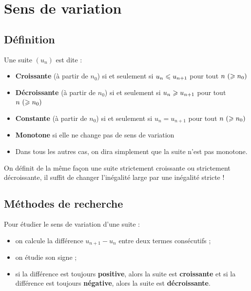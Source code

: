\documentclass[a4paper,11pt]{article}
\begin{document}
\pagebreak

\section{Sens de variation}

\subsection{Définition}

\begin{cdefi}
Une suite $(u_n)$ est dite :
\begin{itemize}
	\item \textbf{Croissante} (à partir de $n_0$) si et seulement si $u_n \leqslant u_{n+1}$ pour tout $n~ (\geqslant n_0)$  
	\item \textbf{Décroissante} (à partir de $n_0$) si et seulement si $u_n \geqslant u_{n+1}$ pour tout $n~ (\geqslant n_0)$  
	\item \textbf{Constante} (à partir de $n_0$) si et seulement si $u_n = u_{n+1}$ pour tout $n ~(\geqslant n_0)$ 
	\item \textbf{Monotone} si elle ne change pas de sens de variation
	\item Dans tous les autres cas, on dira simplement que la suite n'est pas monotone.
\end{itemize}
\end{cdefi}

\begin{crmq}
On définit de la même façon une suite strictement croissante ou strictement décroissante, il suffit de changer l'inégalité large par une inégalité stricte !
\end{crmq}

\subsection{Méthodes de recherche}

\begin{cmethode}
Pour étudier le sens de variation d'une suite :
\begin{itemize}
	\item on calcule la différence $u_{n+1}-u_n$ entre deux termes consécutifs ;
	\item on étudie son signe ;
	\item si la différence est toujours \textbf{positive}, alors la suite est \textbf{croissante} et si la différence est toujours \textbf{négative}, alors la suite est \textbf{décroissante}.
\end{itemize}
\end{cmethode}
\end{document}
